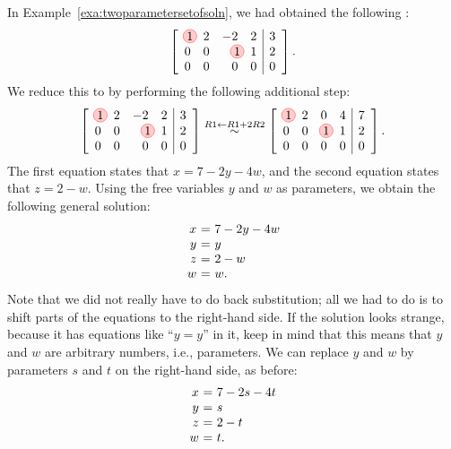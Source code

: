 \begin{solution}
  In Example~\ref{exa:twoparametersetofsoln}, we had obtained the
  following {\ef}:
  \begin{equation*}
    \leftB
    \begin{array}{rrrr|r}
      \circled{1} & 2 & -2 & 2 & 3 \\
      0 & 0 & \circled{1} & 1 & 2 \\
      0 & 0 & 0 & 0 & 0
    \end{array}
    \rightB.
  \end{equation*}
  We reduce this to {\rref} by performing the following additional
  step:
  \begin{equation*}
    \leftB
    \begin{array}{rrrr|r}
      \circled{1} & 2 & -2 & 2 & 3 \\
      0 & 0 & \circled{1} & 1 & 2 \\
      0 & 0 & 0 & 0 & 0
    \end{array}
    \rightB
    \stackrel{R1\leftarrow R1+2R2}{\sim}
    \leftB
    \begin{array}{rrrr|r}
      \circled{1} & 2 & 0 & 4 & 7 \\
      0 & 0 & \circled{1} & 1 & 2 \\
      0 & 0 & 0 & 0 & 0
    \end{array}
    \rightB.
  \end{equation*}
  The first equation states that $x=7-2y-4w$, and the second equation
  states that $z=2-w$. Using the free variables $y$ and $w$ as
  parameters, we obtain the following general solution:
  \begin{equation*}
    \begin{array}{r@{~}c@{~}l}
      x &=& 7-2y-4w \\
      y &=& y \\
      z &=& 2-w \\
      w &=& w.
    \end{array}
  \end{equation*}
  Note that we did not really have to do back substitution; all we had
  to do is to shift parts of the equations to the right-hand side. If
  the solution looks strange, because it has equations like ``$y=y$''
  in it, keep in mind that this means that $y$ and $w$ are arbitrary
  numbers, i.e., parameters. We can replace $y$ and $w$ by parameters
  $s$ and $t$ on the right-hand side, as before:
  \begin{equation*}
    \begin{array}{r@{~}c@{~}l}
      x &=& 7-2s-4t \\
      y &=& s \\
      z &=& 2-t \\
      w &=& t.
    \end{array}
  \end{equation*}
\end{solution}

